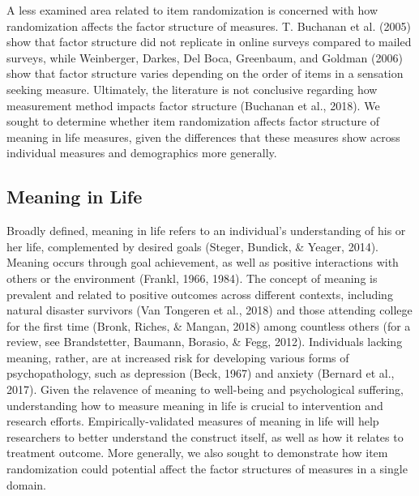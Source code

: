 \documentclass[man,draftall]{apa6}
\begin{document}
A less examined area related to item randomization is concerned with how randomization affects the factor structure of measures. T. Buchanan et al. (2005) show that factor structure did not replicate in online surveys compared to mailed surveys, while Weinberger, Darkes, Del Boca, Greenbaum, and Goldman (2006) show that factor structure varies depending on the order of items in a sensation seeking measure. Ultimately, the literature is not conclusive regarding how measurement method impacts factor structure (Buchanan et al., 2018). We sought to determine whether item randomization affects factor structure of meaning in life measures, given the differences that these measures show across individual measures and demographics more generally.

\hypertarget{meaning-in-life}{%
\subsection{Meaning in Life}\label{meaning-in-life}}

Broadly defined, meaning in life refers to an individual's understanding of his or her life, complemented by desired goals (Steger, Bundick, \& Yeager, 2014). Meaning occurs through goal achievement, as well as positive interactions with others or the environment (Frankl, 1966, 1984). The concept of meaning is prevalent and related to positive outcomes across different contexts, including natural disaster survivors (Van Tongeren et al., 2018) and those attending college for the first time (Bronk, Riches, \& Mangan, 2018) among countless others (for a review, see Brandstetter, Baumann, Borasio, \& Fegg, 2012). Individuals lacking meaning, rather, are at increased risk for developing various forms of psychopathology, such as depression (Beck, 1967) and anxiety (Bernard et al., 2017). Given the relavence of meaning to well-being and psychological suffering, understanding how to measure meaning in life is crucial to intervention and research efforts. Empirically-validated measures of meaning in life will help researchers to better understand the construct itself, as well as how it relates to treatment outcome. More generally, we also sought to demonstrate how item randomization could potential affect the factor structures of measures in a single domain.
\end{document}
